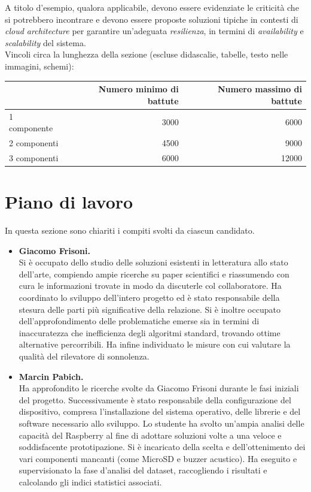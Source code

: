 \documentclass[12pt]{article}
\begin{document}
A titolo d’esempio, qualora applicabile, devono essere evidenziate le criticità che si potrebbero incontrare e devono essere proposte soluzioni tipiche in contesti di \textit{cloud architecture} per garantire un'adeguata \textit{resilienza}, in termini di \textit{availability} e \textit{scalability} del sistema.\\

Vincoli circa la lunghezza della sezione (escluse didascalie, tabelle, testo nelle immagini, schemi):

\vspace{1cm}
\begin{tabular}{l|rr}
 & Numero minimo di battute & Numero massimo di battute \\
 \hline
 1 componente & 3000 & 6000 \\
 2 componenti & 4500 & 9000 \\
 3 componenti & 6000 & 12000 \\
 \hline
\end{tabular}
\fi

\newpage



\section{Piano di lavoro}
\label{sec:work_planning}
In questa sezione sono chiariti i compiti svolti da ciascun candidato.

\begin{itemize}
	\item \textbf{Giacomo Frisoni.}\\
	Si è occupato dello studio delle soluzioni esistenti in letteratura allo stato dell'arte, compiendo ampie ricerche su paper scientifici e riassumendo con cura le informazioni trovate in modo da discuterle col collaboratore. Ha coordinato lo sviluppo dell'intero progetto ed è stato responsabile della stesura delle parti più significative della relazione. Si è inoltre occupato dell'approfondimento delle problematiche emerse sia in termini di inaccuratezza che inefficienza degli algoritmi standard, trovando ottime alternative percorribili. Ha infine individuato le misure con cui valutare la qualità del rilevatore di sonnolenza.
	\item \textbf{Marcin Pabich.}\\
	Ha approfondito le ricerche svolte da Giacomo Frisoni durante le fasi iniziali del progetto. Successivamente è stato responsabile della configurazione del dispositivo, compresa l'installazione del sistema operativo, delle librerie e del software necessario allo sviluppo. Lo studente ha svolto un'ampia analisi delle capacità del Raspberry al fine di adottare soluzioni volte a una veloce e soddisfacente prototipazione. Si è incaricato della scelta e dell'ottenimento dei vari componenti mancanti (come MicroSD e buzzer acustico). Ha eseguito e supervisionato la fase d'analisi del dataset, raccogliendo i risultati e calcolando gli indici statistici associati. 
\end{itemize}
\end{document}
